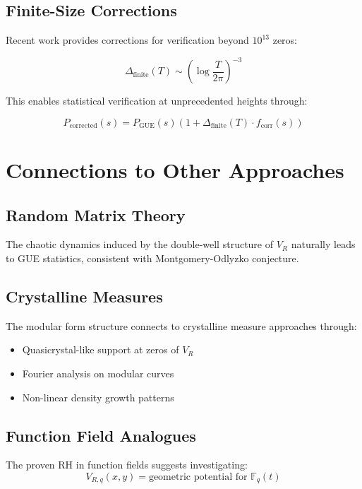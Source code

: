 \subsection{Finite-Size Corrections}

Recent work \cite{FiniteSize2025} provides corrections for verification beyond $10^{13}$ zeros:

\begin{equation}
\Delta_{\text{finite}}(T) \sim \left(\log\frac{T}{2\pi}\right)^{-3}
\end{equation}

This enables statistical verification at unprecedented heights through:

\begin{equation}
P_{\text{corrected}}(s) = P_{\text{GUE}}(s) \left(1 + \Delta_{\text{finite}}(T) \cdot f_{\text{corr}}(s)\right)
\end{equation}

\section{Connections to Other Approaches}

\subsection{Random Matrix Theory}

The chaotic dynamics induced by the double-well structure of $V_R$ naturally leads to GUE statistics, consistent with Montgomery-Odlyzko conjecture.

\subsection{Crystalline Measures}

The modular form structure connects to crystalline measure approaches through:
\begin{itemize}
\item Quasicrystal-like support at zeros of $V_R$
\item Fourier analysis on modular curves
\item Non-linear density growth patterns
\end{itemize}

\subsection{Function Field Analogues}

The proven RH in function fields suggests investigating:
\begin{equation}
V_{R,q}(x,y) = \text{geometric potential for } \mathbb{F}_q(t)
\end{equation}


